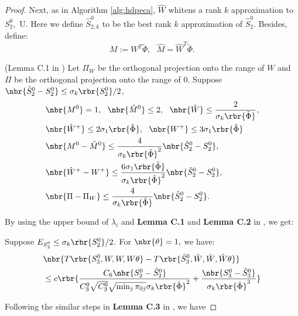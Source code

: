 \documentclass[twoside,11pt]{article}
\begin{document}
{\begin{proof}
Next, as in Algorithm \ref{alg:hdpeca}, $\hat{W}$ whitens a rank $k$ approximation to $S_2^0,$ U. Here we define $\hat{S}_{2,k}^0$ to be the best rank $k$ approximation of $\hat{S}_2^0$. Besides, define:
\begin{equation}
	M := W^T \tilde{\Phi}, \,\,\,\, \hat{M} = \hat{W}^T \tilde{\Phi}.
\end{equation}
\begin{lemma}{(Lemma C.1 in \cite{AnaFosHsuKakLiu12})}
  \label{lemma:W_bounds}
Let $\Pi_W$ be the orthogonal projection onto the range of $W$ and $\Pi$ be the orthogonal projection onto the range of $0$. Suppose $\nbr{\hat{S}_2^{0} - S_2^0} \leq \sigma_k \rbr{S_2^0}/2$,
\begin{equation}
\begin{aligned}
&\nbr{M^0} = 1,\,\,\,\, \nbr{\hat{M}^0} \leq 2, \,\,\,\,  \nbr{\hat{W}} \leq \frac{2}{\sigma_k\rbr{\tilde{\Phi}}},\\
  &\nbr{\hat{W}^+} \leq 2 \sigma_1\rbr{\tilde{\Phi}},\,\,\,\,  \nbr{W^+} \leq 3 \sigma_1\rbr{\tilde{\Phi}} \\
&\nbr{M^0 - \hat{M}^0} \leq \frac{4}{\sigma_k\rbr{\tilde{\Phi}}^2}\nbr{\hat{S}_2^0 - S_2^0} ,\\
 &\nbr{\hat{W}^+ - W^+} \leq \frac{6\sigma_1\rbr{\tilde{\Phi}}}{\sigma_k \rbr{\tilde{\Phi}}^2} \nbr{\hat{S}_2^0 - S_2^0},\\
 &\nbr{\Pi - \Pi_W} \leq \frac{4}{\sigma_k\rbr{\tilde{\Phi}}}\nbr{\hat{S}_2^0 - S_2^0}.
\end{aligned}
\end{equation}
\end{lemma}
By using the upper bound of $\lambda_i$ and {\bf Lemma C.1} and {\bf Lemma C.2} in \cite{AnaFosHsuKakLiu12}, we get:
\begin{lemma}{}
  \label{lemma:Ws2_bounds}
Suppose $E_{S_2^0} \leq \sigma_k \rbr{S_2^0}/2$. For $\nbr{\theta} = 1,$ we have:
\begin{equation}
\begin{aligned}
&\nbr{T\rbr{ S_3^0, W, W,W\theta} -T\rbr{ \hat{S}_3^0, \hat{W}, \hat{W},\hat{W}\theta}  }\\
&\leq c \rbr{\frac{C_6 \nbr{S_2^0-\hat{S}_2^0}}{C_3^0 \sqrt{C_3^0} \sqrt{\min_j \pi_{0j}}\sigma_k\rbr{\tilde{\Phi}}^2} + \frac{\nbr{S_3^0-\hat{S}_3^0}}{ \sigma_k\rbr{\tilde{\Phi}}^3}} 
\end{aligned} 
\end{equation}
\end{lemma}
Following the similar steps in  {\bf Lemma C.3} in \cite{AnaFosHsuKakLiu12}, we have

\end{proof}}
\end{document}
